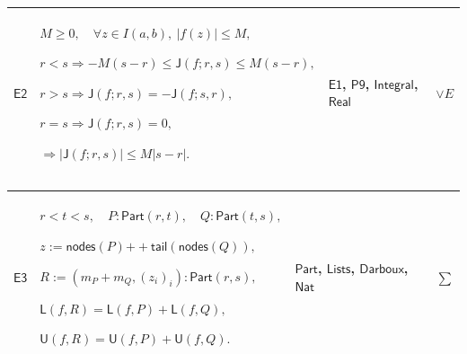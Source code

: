 \documentclass[11pt]{amsart}
\newlength{\FTCFourColumnBody}
\begin{document}
{\begin{tabular}
\end{tabular}%
\par\setlength{\parskip}{0pt}\nointerlineskip
\noindent
\begin{tabular}{|@{}>{\centering\arraybackslash}m{0.078431\FTCFourColumnBody}|>{\centering\arraybackslash}m{0.535947\FTCFourColumnBody}|>{\centering\arraybackslash}m{0.281045\FTCFourColumnBody}|>{\centering\arraybackslash}m{0.104575\FTCFourColumnBody}|}\hline
\hypertarget{proof:E2}{$\displaystyle \textsf{E2}$} & $\displaystyle M\ge0,\quad\forall z\in I(a,b),\ |f(z)|\le M,$\par
$\displaystyle r<s\Rightarrow-M(s-r)\le\textsf{J}(f;r,s)\le M(s-r),$\par
$\displaystyle r>s\Rightarrow\textsf{J}(f;r,s)=-\textsf{J}(f;s,r),$\par
$\displaystyle r=s\Rightarrow\textsf{J}(f;r,s)=0,$\par
$\displaystyle \Rightarrow|\textsf{J}(f;r,s)|\le M|s-r|.$ & \hyperlink{proof:E1}{$\displaystyle \textsf{E1}$}, \hyperlink{proof:P9}{$\displaystyle \textsf{P9}$}, \hyperlink{def:Integral}{$\displaystyle \textsf{Integral}$}, \hyperlink{ax:Real}{$\displaystyle \textsf{Real}$} & $\displaystyle \lor E$\\ \hline
\end{tabular}%
\par\setlength{\parskip}{0pt}\nointerlineskip
\noindent
\begin{tabular}{|@{}>{\centering\arraybackslash}m{0.078431\FTCFourColumnBody}|>{\centering\arraybackslash}m{0.535947\FTCFourColumnBody}|>{\centering\arraybackslash}m{0.281045\FTCFourColumnBody}|>{\centering\arraybackslash}m{0.104575\FTCFourColumnBody}|}\hline
\hypertarget{proof:E3}{$\displaystyle \textsf{E3}$} & $\displaystyle r<t<s,\quad P:\textsf{Part}(r,t),\quad Q:\textsf{Part}(t,s),$\par
$\displaystyle z:=\textsf{nodes}(P)\mathbin{+\!\!+}\textsf{tail}(\textsf{nodes}(Q)),$\par
$\displaystyle R:=(m_P+m_Q,(z_i)_i):\textsf{Part}(r,s),$\par
$\displaystyle \textsf{L}(f,R)=\textsf{L}(f,P)+\textsf{L}(f,Q),$\par
$\displaystyle \textsf{U}(f,R)=\textsf{U}(f,P)+\textsf{U}(f,Q).$ & \hyperlink{def:Part}{$\displaystyle \textsf{Part}$}, \hyperlink{def:Lists}{$\displaystyle \textsf{Lists}$}, \hyperlink{def:Darboux}{$\displaystyle \textsf{Darboux}$}, \hyperlink{ax:Nat}{$\displaystyle \textsf{Nat}$} & $\displaystyle \sum$\\ \hline

\end{tabular}}
\end{document}
